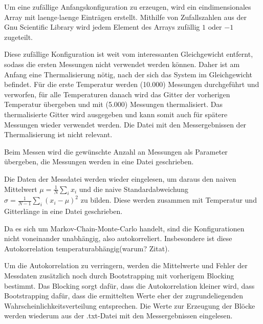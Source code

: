 \documentclass{scrreprt}
\begin{document}
	Um eine zufällige Anfangskonfiguration zu erzeugen, wird ein eindimensionales Array mit laenge$\cdot$laenge Einträgen erstellt. Mithilfe von Zufallszahlen aus der Gnu Scientific Library \cite{gsldoc} wird jedem Element des Arrays zufällig $1$ oder $-1$ zugeteilt.	
	
	Diese zufällige Konfiguration ist weit vom interessanten Gleichgewicht entfernt, sodass die ersten Messungen nicht verwendet werden können. Daher ist am Anfang eine Thermalisierung nötig, nach der sich das System im Gleichgewicht befindet. Für die erste Temperatur werden (10.000) Messungen durchgeführt und verworfen, für alle Temperaturen danach wird das Gitter der vorherigen Temperatur übergeben und mit (5.000) Messungen thermalisiert. Das thermalisierte Gitter wird ausgegeben und kann somit auch für spätere Messungen wieder verwendet werden. Die Datei mit den Messergebnissen der Thermalisierung ist nicht relevant.
	
	Beim Messen wird die gewünschte Anzahl an Messungen als Parameter übergeben, die Messungen werden in eine Datei geschrieben.
	
	
	
	Die Daten der Messdatei werden wieder eingelesen, um daraus den naiven Mittelwert $\mu=\frac{1}{N}\sum_{i} x_i$ und die naive Standardabweichung $\sigma=\frac{1}{N-1}\sum_{i}(x_i-\mu)^2$ zu bilden. Diese werden zusammen mit Temperatur und Gitterlänge in eine Datei geschrieben.
	
	Da es sich um Markov-Chain-Monte-Carlo handelt, sind die Konfigurationen nicht voneinander unabhängig, also autokorreliert. Insbesondere ist diese Autokorrelation temperaturabhängig(warum? Zitat).
	
	Um die Autokorrelation zu verringern, werden die Mittelwerte und Fehler der Messdaten zusätzlich noch durch Bootstrapping mit vorherigem Blocking bestimmt. Das Blocking sorgt dafür, dass die Autokorrelation kleiner wird, dass Bootstrapping dafür, dass die ermittelten Werte eher der zugrundeliegenden Wahrscheinlichkeitsverteilung entsprechen. Die Werte zur Erzeugung der Blöcke werden wiederum aus der .txt-Datei mit den Messergebnissen eingelesen.
	
\end{document}
